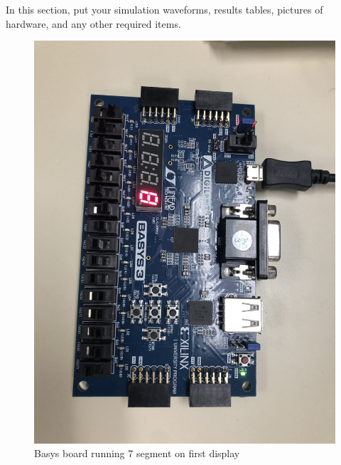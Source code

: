 \documentclass[11pt]{article}
\begin{document}
In this section, put your simulation waveforms, results tables, pictures of hardware, and any other required items.
\begin{figure}
	\includegraphics[width= \textwidth]{basys1.png}
	\caption{Basys board running 7 segment on first display }\label{fig:Basys1}
\end{figure}
\end{document}
